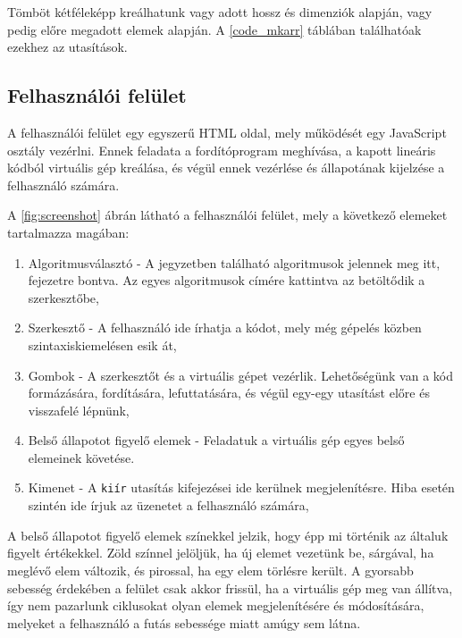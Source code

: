 Tömböt kétféleképp kreálhatunk vagy adott hossz és dimenziók alapján, vagy pedig előre megadott elemek alapján. A \ref{code_mkarr} táblában találhatóak ezekhez az utasítások.

\subsection{Felhasználói felület}

A felhasználói felület egy egyszerű HTML oldal, mely működését egy JavaScript osztály vezérlni. Ennek feladata a fordítóprogram meghívása, a kapott lineáris kódból virtuális gép kreálása, és végül ennek vezérlése és állapotának kijelzése a felhasználó számára. 


A \ref{fig:screenshot} ábrán látható a felhasználói felület, mely a következő elemeket tartalmazza magában:

\begin{enumerate}
    \item Algoritmusválasztó - A jegyzetben található algoritmusok jelennek meg itt, fejezetre bontva. Az egyes algoritmusok címére kattintva az betöltődik a szerkesztőbe,
    \item Szerkesztő - A felhasználó ide írhatja a kódot, mely még gépelés közben szintaxiskiemelésen esik át,
    \item Gombok - A szerkesztőt és a virtuális gépet vezérlik. Lehetőségünk van a kód formázására, fordítására, lefuttatására, és végül egy-egy utasítást előre és visszafelé lépnünk,
    \item Belső állapotot figyelő elemek - Feladatuk a virtuális gép egyes belső elemeinek követése.
    \item Kimenet - A \texttt{kiír} utasítás kifejezései ide kerülnek megjelenítésre. Hiba esetén szintén ide írjuk az üzenetet a felhasználó számára,
\end{enumerate}

A belső állapotot figyelő elemek színekkel jelzik, hogy épp mi történik az általuk figyelt értékekkel. Zöld színnel jelöljük, ha új elemet vezetünk be, sárgával, ha meglévő elem változik, és pirossal, ha egy elem törlésre került. A gyorsabb sebesség érdekében a felület csak akkor frissül, ha a virtuális gép meg van állítva, így nem pazarlunk ciklusokat olyan elemek megjelenítésére és módosítására, melyeket a felhasználó a futás sebessége miatt amúgy sem látna.